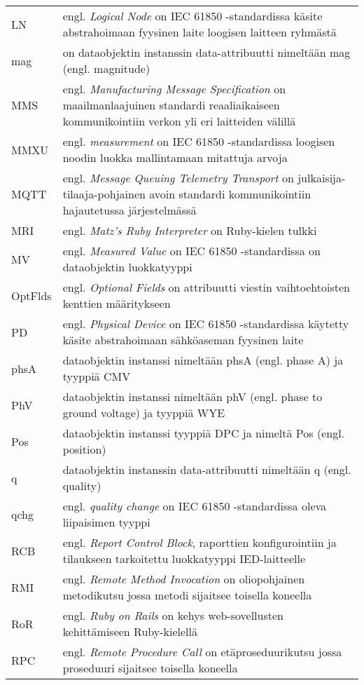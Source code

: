 \begin{tabularx}{\linewidth}[h]{@{} p{} p{} @{}}
	LN & engl. \emph{Logical Node} on IEC 61850 -standardissa käsite abstrahoimaan fyysinen laite loogisen laitteen ryhmästä \\
	mag & on dataobjektin instanssin data-attribuutti nimeltään mag (engl. magnitude) \\
	MMS & engl. \emph{Manufacturing Message Specification} on maailmanlaajuinen standardi reaaliaikaiseen kommunikointiin verkon yli eri laitteiden välillä \\
	MMXU & engl. \emph{measurement} on IEC 61850 -standardissa loogisen noodin luokka mallintamaan mitattuja arvoja \\
	MQTT & engl. \emph{Message Queuing Telemetry Transport} on julkaisija-tilaaja-pohjainen avoin standardi kommunikointiin hajautetussa järjestelmässä \\
	MRI & engl. \emph{Matz’s Ruby Interpreter} on Ruby-kielen tulkki \\
	MV & engl. \emph{Measured Value} on IEC 61850 -standardissa on dataobjektin luokkatyyppi \\
	OptFlds & engl. \emph{Optional Fields} on attribuutti viestin vaihtoehtoisten kenttien määritykseen \\
	PD & engl. \emph{Physical Device} on IEC 61850 -standardissa käytetty käsite abstrahoimaan sähköaseman fyysinen laite \\
	phsA & dataobjektin instanssi nimeltään phsA (engl. phase A) ja tyyppiä CMV \\
	PhV & dataobjektin instanssi nimeltään phV (engl. phase to ground voltage) ja tyyppiä WYE \\
	Pos & dataobjektin instanssi tyyppiä DPC ja nimeltä Pos (engl. position) \\
	q & dataobjektin instanssin data-attribuutti nimeltään q (engl. quality) \\
	qchg & engl. \emph{quality change} on IEC 61850 -standardissa oleva liipaisimen tyyppi \\
	RCB & engl. \emph{Report Control Block}, raporttien konfigurointiin ja tilaukseen tarkoitettu luokkatyyppi IED-laitteelle \\
	RMI & engl. \emph{Remote Method Invocation} on oliopohjainen metodikutsu jossa metodi sijaitsee toisella koneella \\
	RoR & engl. \emph{Ruby on Rails} on kehys web-sovellusten kehittämiseen Ruby-kielellä \\
	RPC & engl. \emph{Remote Procedure Call} on etäproseduurikutsu jossa proseduuri sijaitsee toisella koneella \\

\end{tabularx}

